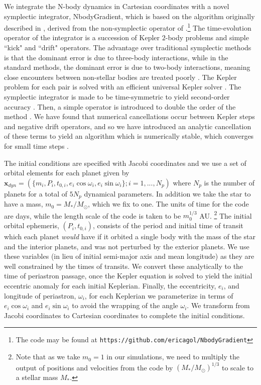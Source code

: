 \documentclass[twocolumn]{aastex63}
\begin{document}
We integrate the N-body dynamics in Cartesian coordinates with a novel symplectic 
integrator, \textsf{NbodyGradient}, which is based on the algorithm originally described in \cite{Hernandez2015}, derived from the non-symplectic operator of \cite{GoncalvesFerrari2014}.\footnote{The code may be found at 
\texttt{https://github.com/ericagol/NbodyGradient}}  The time-evolution operator of the integrator is a succession of Kepler $2$-body problems and simple ``kick" and ``drift" operators.  %
The advantage over traditional symplectic methods \citep{Wisdom1991} is that the dominant error is due to three-body interactions, while in the standard methods, the dominant error is due to two-body interactions, meaning close encounters between non-stellar bodies are treated poorly \citep{Hernandez2017}.    The Kepler problem
for each pair is solved with an efficient universal Kepler solver \citep{Wisdom2015}.
The symplectic integrator is made to be time-symmetric to yield second-order
accuracy \citep{Hernandez2015}.  Then, a simple operator is introduced to double the order of the method \citep{Dehnen2017}.
We have found that numerical cancellations occur between Kepler steps
and negative drift operators, and so we have introduced an analytic cancellation
of these terms to yield an algorithm which is numerically stable,
which converges for small time steps \citep{Agol2020}.

The initial conditions are specified with Jacobi coordinates and
we use a set of orbital elements for each planet given by
$\mathbf{x}_{dyn} = (\{m_i,P_i,t_{0,i},e_i \cos{\omega_i},e_i\sin{\omega_i}\}; i = 1,...,N_p)$ 
where $N_p$ is the number of planets for a total of $5N_p$ dynamical parameters. In
addition we take the star to have a mass, $m_0 = M_*/M_\odot$, which we fix to one.
The units of time for the code are days, while the length scale of the code is taken to be $m_0^{1/3}$ AU. \footnote{Note that as we take $m_0=1$ in our simulations, we need to multiply
the output of positions and velocities from the code by $(M_*/M_\odot)^{1/3}$ to scale to a stellar mass $M_*$.}
The initial orbital ephemeris, $(P_i,t_{0,i})$, consists of the period and initial time of
transit which each planet {\it would} have if it orbited a single
body with the mass of the star and the interior planets, and was
not perturbed by the exterior planets.  We use these variables (in lieu of initial semi-major axis and mean longitude) as
they are well constrained by the times of transits.  We convert
these analytically to the time of periastron passage, once the
Kepler equation is solved to yield the initial eccentric anomaly
for each initial Keplerian.  Finally, the eccentricity, $e_i$, and
longitude of periastron, $\omega_i$, for each Keplerian we
parameterize in terms of $e_i\cos{\omega_i}$ and $e_i\sin{\omega_i}$
to avoid the wrapping of the angle $\omega_i$.   We transform from Jacobi coordinates to Cartesian coordinates to complete the initial conditions.
\end{document}
